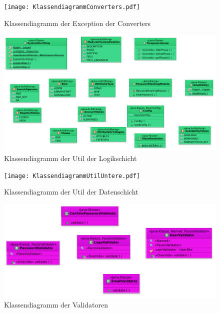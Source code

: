\documentclass{article}
\begin{document}
\begin{center}
    \begin{figure}[H]
        \texttt{[image: KlassendiagrammConverters.pdf]}
        \caption{Klassendiagramm der Exception der Converters }
        \label{fig:Dtos- Klassendiagramm}
    \end{figure}
\end{center}

\begin{center}
    \begin{figure}[H]
        \includegraphics[scale=0.4]{KlassendiagrammUtilObere.pdf}
        \caption{Klassendiagramm der Util der Logikschicht }
        \label{fig:Util-logik Klassendiagramm}
    \end{figure}
\end{center}

\begin{center}
    \begin{figure}[H]
        \texttt{[image: KlassendiagrammUtilUntere.pdf]}
        \caption{Klassendiagramm der Util der Datenschicht }
        \label{fig:Util-data Klassendiagramm}
    \end{figure}
\end{center}

\begin{center}
    \begin{figure}[H]
        \includegraphics[scale=0.6]{KlassendiagrammValidators.pdf}
        \caption{Klassendiagramm der Validatoren }
        \label{fig:Util-data Klassendiagramm}
    \end{figure}
\end{center}
\restoregeometry
\newpage
\end{document}
